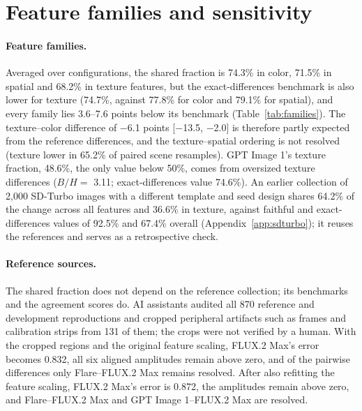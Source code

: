 \FloatBarrier
\section{Feature families and sensitivity}\label{app:sensitivity}

\paragraph{Feature families.} Averaged over configurations, the shared fraction is 74.3\% in color,
71.5\% in spatial and 68.2\% in texture features, but the exact-differences benchmark is also lower
for texture (74.7\%, against 77.8\% for color and 79.1\% for spatial), and every family lies 3.6--7.6
points below its benchmark (Table~\ref{tab:families}). The texture--color difference of
$-$6.1 points [$-$13.5, $-$2.0] is therefore partly expected from the reference differences, and the
texture--spatial ordering is not resolved (texture lower in 65.2\% of paired scene resamples). GPT
Image 1's texture fraction, 48.6\%, the only value below 50\%, comes from oversized texture
differences ($B/H=$ 3.11; exact-differences value 74.6\%). An earlier collection of 2,000 SD-Turbo
images with a different template and seed design shares 64.2\% of the change across all features
and 36.6\% in texture, against faithful and exact-differences values of 92.5\% and 67.4\% overall
(Appendix~\ref{app:sdturbo}); it reuses the references and serves as a retrospective check.

\paragraph{Reference sources.} The shared fraction does not depend on the reference collection; its
benchmarks and the agreement scores do. AI assistants audited all 870 reference and development
reproductions and cropped peripheral artifacts such as frames and calibration strips from 131 of
them; the crops were not verified by a human. With the cropped regions and the original feature
scaling, FLUX.2 Max's error becomes 0.832, all six aligned amplitudes remain above zero, and of the
pairwise differences only Flare--FLUX.2 Max remains resolved. After also refitting the feature
scaling, FLUX.2 Max's error is 0.872, the amplitudes remain above zero, and Flare--FLUX.2 Max and GPT
Image 1--FLUX.2 Max are resolved.

